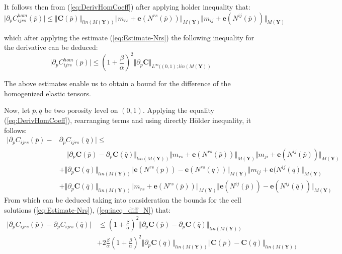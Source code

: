 It follows then from (\ref{eq:DerivHomCoeff}) after applying holder inequality that:
\begin{equation*}
    \vert \partial_p C^{hom}_{ijrs}(\overline{p}) \vert \leq \Vert \mathbf{C}(\overline{p}) \Vert_{lin(M(\mathbf{Y}))} \Vert m_{rs} + \mathbf{e}(N^{rs}(\overline{p})) \Vert_{M(\mathbf{Y})} \Vert m_{ij} + \mathbf{e}(N^{ij}(\overline{p})) \Vert_{M(\mathbf{Y})}
\end{equation*}

which after applying the estimate (\ref{eq:Estimate-Nrs}) the following inequality for the derivative can be deduced:
\begin{equation}
    \label{EstimateDerivHomCoeff}
    \vert \partial_p C^{hom}_{ijrs}(p) \vert \leq (1+\frac{\beta}{\alpha})^2 \Vert \partial_p \mathbf{C}\Vert_{L^{\infty}((0,1); lin(M(\mathbf{Y}))}
\end{equation}

The above estimates enable us to obtain a bound for the difference of the homogenized elastic tensors.

Now, let $\overline{p}, \overline{q}$ be two porosity level on $(0,1)$.
Applying the equality (\ref{eq:DerivHomCoeff}), rearranging terms and using directly H\"{o}lder inequality, it follows:
\begin{align*}
    \vert \partial_p C_{ijrs}(\overline{p}) - & \partial_p C_{ijrs}(\overline{q}) \vert \leq  \quad \\
    &\quad \Vert \partial_p \mathbf{C}(\overline{p}) - \partial_p \mathbf{C}(\overline{q}) \Vert_{lin(M(\mathbf{Y}))} \Vert m_{rs} + \mathbf{e}(N^{rs}(\overline{p})) \Vert_{M(\mathbf{Y})} \Vert m_{ji} + \mathbf{e}(N^{ij}(\overline{p}))\Vert_{M(\mathbf{Y})} \\
    & + \Vert \partial_p \mathbf{C}(\overline{q}) \Vert_{lin(M(\mathbf{Y}))} \Vert \mathbf{e}(N^{rs}(\overline{p})) -\mathbf{e}(N^{rs}(\overline{q})) \Vert_{M(\mathbf{Y})} \Vert m_{ij} + \mathbf{e}(N^{ij}(\overline{q}) \Vert_{M(\mathbf{Y})}  \\
    & + \Vert \partial_p \mathbf{C}(\overline{q}) \Vert_{lin(M(\mathbf{Y}))} \Vert m_{rs} + \mathbf{e}(N^{rs}(\overline{p})) \Vert_{M(\mathbf{Y})} \Vert \mathbf{e}(N^{ij}(\overline{p})) - \mathbf{e}(N^{ij}(\overline{q})) \Vert_{M(\mathbf{Y})}
\end{align*}
From which can be deduced taking into consideration the bounds for the cell solutions (\ref{eq:Estimate-Nrs}), (\ref{eq:ineq_diff_N}) that:
\begin{equation}
    \label{EstimateDiffDeriv}
    \begin{aligned}
        \vert \partial_p C_{ijrs}(\overline{p}) - \partial_p C_{ijrs}(\overline{q}) \vert & \,  \leq (1+ \frac{\beta}{\alpha})^2\Vert \partial_p \mathbf{C}(\overline{p}) - \partial_p \mathbf{C}(\overline{q}) \Vert_{lin(M(\mathbf{Y}))} \\
        & + 2\frac{\beta}{\alpha}(1+\frac{\beta}{\alpha})^2 \Vert \partial_p \mathbf{C}(\overline{q}) \Vert_{lin(M(\mathbf{Y}))} \Vert \mathbf{C}(\overline{p}) - \mathbf{C}(\overline{q}) \Vert_{lin(M(\mathbf{Y}))}
    \end{aligned}
\end{equation}

